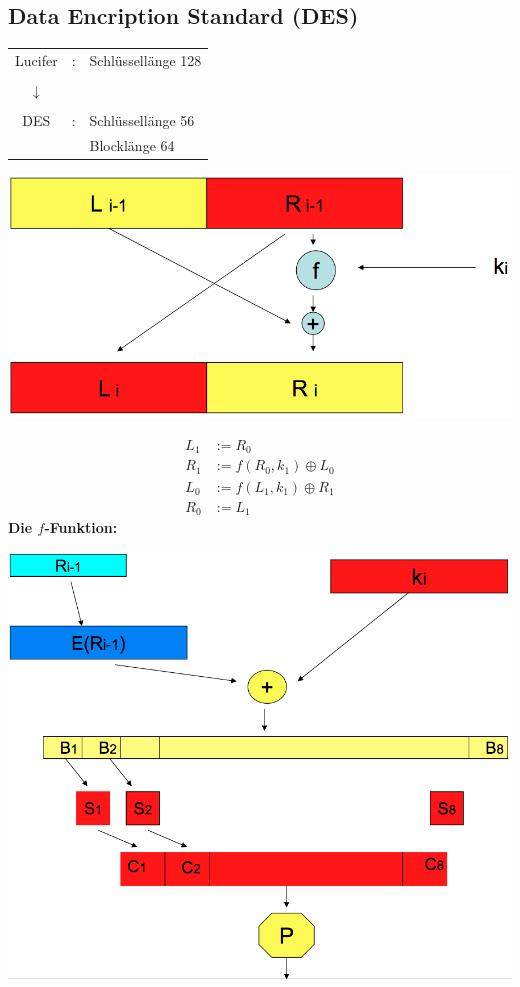 \documentclass[10pt]{article}
\begin{document}
\subsection{Data Encription Standard (DES)}
\begin{tabular}{c l l}
	Lucifer	& : & Schlüssellänge 128 \\ \\
	$\downarrow$ \\\\
	DES & : & Schlüssellänge 56 \\
	& & Blocklänge 64
\end{tabular}
\begin{center}
	\includegraphics[scale=0.2]{horst-feistel.png}
\end{center}
\begin{align}
	L_1 & := R_0 \\
	R_1 & := f(R_0,k_1) \oplus L_0
\end{align}
\begin{align}
	L_0 & := f(L_1,k_1) \oplus R_1 \\
	R_0 & := L_1
\end{align}
\textbf{Die $f$-Funktion:} \\
\begin{center}
	\includegraphics[scale=0.2]{funktion.png}
\end{center}
\end{document}
